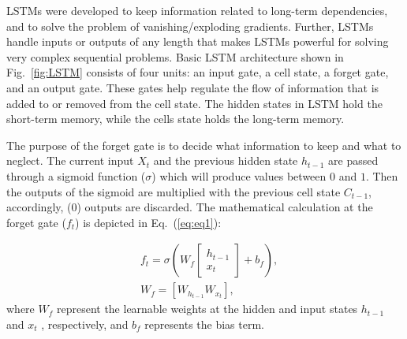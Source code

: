 LSTMs were developed to keep information related to long-term dependencies, and to solve the problem of vanishing/exploding gradients.
Further, LSTMs handle inputs or outputs of any length that makes LSTMs powerful for solving very complex sequential problems. 
Basic LSTM architecture shown in Fig.~\ref{fig:LSTM}  consists of four units: an input gate, a cell state, a forget gate, and an output gate.
These gates help regulate the flow of information that is added to or removed from the cell state. 
The hidden states in LSTM hold the short-term memory, while the cells state holds the long-term memory.  

The purpose of the forget gate is to decide what information to keep and what to neglect. 
The current input \(X_{t}\) and the previous hidden state  \(h_{t-1}\) are passed through a sigmoid function (\(\sigma\)) which will produce values between \(0\) and \(1\).
Then the outputs of the sigmoid are multiplied with the previous cell state \(C_{t-1}\), accordingly, (\(0\)) outputs are discarded.
The mathematical calculation at the forget gate ($f_t$) is depicted in Eq.~(\ref{eq:eq1}):

\begin{align}
	&f_{t}=\sigma\left( W_{f}  
	\left[
	\begin{array}{c}
		h_{t-1} \\ x_{t}
	\end{array} 
	\right]
	+ b_{f} \right), \\
	&W_{f} = \left[ W_{h_{t-1}}  W_{x_{t}} \right],
	\label{eq:eq1}
\end{align}
where \(W_{f}\) represent the learnable weights at the hidden and input states  \(h_{t-1}\) and \(x_{t}\) , respectively, and \(b_{f}\) represents the bias term. 

